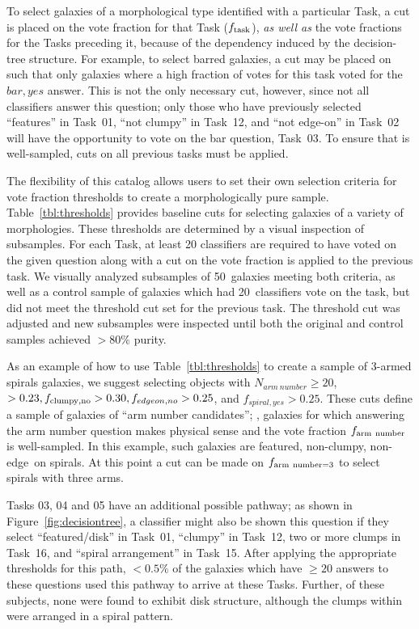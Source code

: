 \documentclass[twocolumn]{aastex6}
\begin{document}
To select galaxies of a morphological type identified with a particular Task, a
cut is placed on the vote fraction for that Task ($f_{\rm task}$), \emph{as
well as} the vote fractions for the Tasks preceding it, because of the
dependency induced by the decision-tree structure. For example, to select
barred galaxies, a cut may be placed on \fbar{} such that only galaxies where a
high fraction of votes for this task voted for the $bar,yes$ answer. This is
not the only necessary cut, however, since not all classifiers answer this question;
only those who have previously selected ``features'' in Task~01, ``not clumpy''
in Task~12, and ``not edge-on'' in Task~02 will have the opportunity to vote on
the bar question, Task~03. To ensure that \fbar{} is well-sampled, cuts on all
previous tasks must be applied. 

The flexibility of this catalog allows users to set their own selection
criteria for vote fraction thresholds to create a morphologically pure sample.
Table~\ref{tbl:thresholds} provides baseline cuts for selecting galaxies of a
variety of morphologies. These thresholds are determined by a visual inspection
of subsamples. For each Task, at least 20 classifiers are required to have voted on
the given question along with a cut on the vote fraction is applied to the
previous task. We visually analyzed subsamples of 50~galaxies meeting both
criteria, as well as a control sample of galaxies which had 20~classifiers vote on
the task, but did not meet the threshold cut set for the previous task. The
threshold cut was adjusted and new subsamples were inspected until both the
original and control samples achieved $>80\%$ purity.

As an example of how to use Table~\ref{tbl:thresholds} to create a sample of
3-armed spirals galaxies, we suggest selecting objects with $N_{arm~number} \ge
20$, \ffeatures$>0.23, f_{\rm clumpy,no} > 0.30, f_{edgeon,no}>0.25$, and
$f_{spiral,yes}>0.25$. These cuts define a sample of galaxies of ``arm number
candidates''; \ie, galaxies for which answering the arm number question makes
physical sense and the vote fraction $f_{\rm arm~number}$ is well-sampled. In
this example, such galaxies are featured, non-clumpy, non-edge~on spirals. At
this point a cut can be made on $f_{\rm arm~number=3}$ to select spirals with
three arms. 

Tasks 03, 04 and 05 have an additional possible pathway; as shown in
Figure~\ref{fig:decisiontree}, a classifier might also be shown this question
if they select ``featured/disk'' in Task~01, ``clumpy'' in Task~12, two or more
clumps in Task~16, and ``spiral arrangement'' in Task~15. After applying
the appropriate thresholds for this path, $< 0.5\%$ of the galaxies which
have $\ge 20$ answers to these questions used this pathway to arrive at
these Tasks.  Further, of these subjects, none were found to exhibit disk
structure, although the clumps within were arranged in a spiral pattern. 
\end{document}
